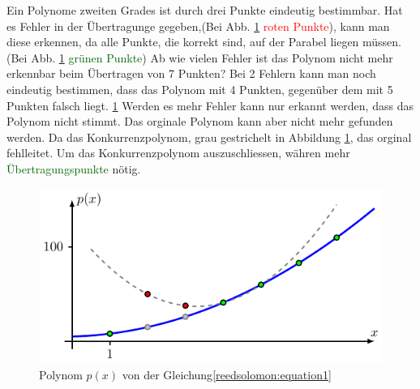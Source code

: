 \begin{beispiel}
Ein Polynome zweiten Grades ist durch drei Punkte eindeutig bestimmbar.
Hat es Fehler in der Übertragunge gegeben,(Bei Abb. \ref{fig:polynom} \textcolor{red}{roten Punkte}),
kann man diese erkennen, da alle Punkte, die korrekt sind, auf der Parabel liegen müssen. 
(Bei Abb. \ref{fig:polynom} \textcolor{darkgreen}{grünen Punkte})
Ab wie vielen Fehler ist das Polynom nicht mehr erkennbar beim Übertragen von 7 Punkten?
Bei 2 Fehlern kann man noch eindeutig bestimmen, dass das Polynom mit 4 Punkten,
gegenüber dem mit 5 Punkten falsch liegt. \ref{fig:polynom}
Werden es mehr Fehler kann nur erkannt werden, dass das Polynom nicht stimmt.
Das orginale Polynom kann aber nicht mehr gefunden werden.
Da das Konkurrenzpolynom, grau gestrichelt in Abbildung \ref{fig:polynom}, das orginal fehlleitet.
Um das Konkurrenzpolynom auszuschliessen, währen mehr \textcolor{darkgreen}{Übertragungspunkte} nötig.
\end{beispiel}

\begin{figure}
	\centering
	\includegraphics[width=\textwidth]{papers/reedsolomon/figures/polynom2}
	\caption{Polynom $p(x)$ von der Gleichung\eqref{reedsolomon:equation1}}
	\label{fig:polynom}
\end{figure}

